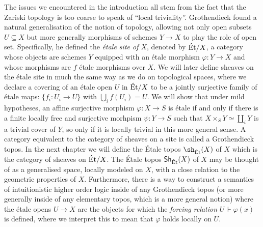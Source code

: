The issues we encountered in the introduction all stem from the fact that the Zariski topology is too coarse to speak of ``local triviality''. Grothendieck found a natural generalisation of the notion of topology, allowing not only open subsets $U \subseteq X$ but more generally morphisms of schemes $Y \to X$ to play the role of open set. Specifically, he defined the \textit{\'etale site of $X$}, denoted by $\text{\'Et}/X$, a category whose objects are schemes $Y$ equipped with an \'etale morphism $\varphi \colon Y \to X$ and whose morphisms are $f$ \'etale morphisms over $X$. We will later define sheaves on the \'etale site in much the same way as we do on topological spaces, where we declare a covering of an \'etale open $U$ in $\text{\'Et}/X$ to be a jointly surjective family of \'etale maps: $\{f_i \colon U_i \to U\}$ with $\bigcup_i f(U_i) = U$. We will show that under mild hypotheses, an affine surjective morphism $\varphi \colon X \to S$ is \'etale if and only if there is a finite locally free and surjective morhpism $\psi \colon Y \to S$ such that $X \times_S Y \simeq \coprod_i Y$ is a trivial cover of $Y$, so only if it is locally trivial in this more general sense. A category equivalent to the category of sheaves on a site is called a Grothendieck topos. In the next chapter we will define the \'Etale topos $\sh_{\Et}(X)$ of $X$ which is the category of sheaves on $\text{\'Et}/X$. The \'Etale topos $\mathsf{Sh}_{\text{\'Et}}(X)$ of $X$ may be thought of as a generalised space, locally modeled on $X$, with a close relation to the geometric properties of $X$. Furthermore, there is a way to construct a semantics of intuitionistic higher order logic inside of any Grothendieck topos (or more generally inside of any elementary topos, which is a more general notion) where the \'etale opens $U \to X$ are the objects for which the \textit{forcing relation} $U \Vdash \varphi(x)$ is defined, where we interpret this to mean that $\varphi$ holds locally on $U$.





